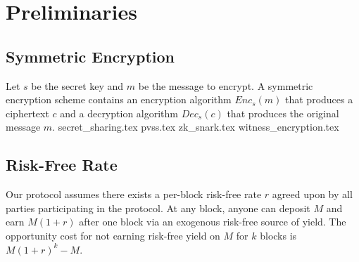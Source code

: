 \section{Preliminaries}
    \subsection{Symmetric Encryption}
    Let $s$ be the secret key and $m$ be the message to encrypt.
    A symmetric encryption scheme contains an encryption algorithm $Enc_s(m)$ that produces a ciphertext $c$ and a decryption algorithm $Dec_s(c)$ that produces the original message $m$.
    {secret_sharing.tex}
    {pvss.tex}
    {zk_snark.tex}
    {witness_encryption.tex}
    \subsection{Risk-Free Rate}\label{subsection:prelim-rfr}
    Our protocol assumes there exists a per-block risk-free rate $r$ agreed upon by all parties participating in the protocol.
    At any block, anyone can deposit $M$ and earn $M(1 + r)$ after one block via an exogenous risk-free source of yield.
    The opportunity cost for not earning risk-free yield on $M$ for $k$ blocks is $M(1 + r)^k - M$.

